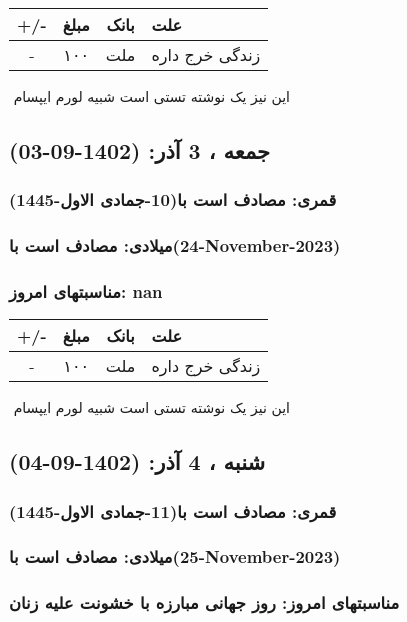 \documentclass{article}
\newcommand{\rnote}[1]{\marginpar{\textcolor{color}{\StrSubstitute{\##1}{ }{\_}}}}
\newcommand{\myRow}[4]{
    #1 & #2 & #3 & #4 \\ \hline
}
\begin{document}
\begin{tabular}{ | c | c | c | p{5cm} |}
    \hline
    \myRow{ +/- }{مبلغ}{بانک}{علت}
    \myRow{-}{۱۰۰}{ملت}{زندگی خرج داره}
\end{tabular}
\newline
\newline

‌
\rnote{تست}
این نیز یک نوشته تستی است شبیه لورم ایپسام




\newpage
{}
\textcolor{color}{
\section{ جمعه ، 3 آذر: (1402-09-03) }
\subsubsection*{قمری: مصادف است با(10-جمادی الاول-1445)} 
\subsubsection*{میلادی: مصادف است با(24-November-2023)}
\subsubsection*{مناسبتهای امروز: nan}
}


\begin{tabular}{ | c | c | c | p{5cm} |}
    \hline
    \myRow{ +/- }{مبلغ}{بانک}{علت}
    \myRow{-}{۱۰۰}{ملت}{زندگی خرج داره}
\end{tabular}
\newline
\newline

‌
\rnote{تست}
این نیز یک نوشته تستی است شبیه لورم ایپسام




\newpage
{}
\textcolor{color}{
\section{ شنبه ، 4 آذر: (1402-09-04) }
\subsubsection*{قمری: مصادف است با(11-جمادی الاول-1445)} 
\subsubsection*{میلادی: مصادف است با(25-November-2023)}
\subsubsection*{مناسبتهای امروز: روز جهانی مبارزه با خشونت علیه زنان}
}
\end{document}
